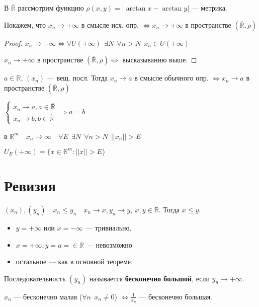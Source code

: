 В $\mathbb{\overline R}$ рассмотрим функцию $\rho(x,y)=|\arctan x - \arctan y|$ --- метрика.

Покажем, что $x_n\to +\infty$ в смысле исх. опр. $\Leftrightarrow x_n\to+\infty$ в пространстве $(\mathbb{\overline R}, \rho)$

\begin{proof}
$x_n\to+\infty \Leftrightarrow \forall U(+\infty) \ \ \exists N \ \ \forall n>N \ \ x_n\in U(+\infty)$

$x_n\to+\infty$ в пространстве $(\mathbb{\overline R}, \rho) \Leftrightarrow $ высказыванию выше.
\end{proof}

\begin{remark}
$a\in\mathbb{R}$, $(x_n)$ --- вещ. посл. Тогда $x_n\to a$ в смысле обычного опр. $\Leftrightarrow x_n\to a$ в пространстве $(\mathbb{\overline R}, \rho)$
\end{remark}

$\begin{cases}
    x_n\to a, a\in\mathbb{\overline R} \\
    x_n\to b, b\in\mathbb{\overline R}
\end{cases} \Rightarrow a=b$

в $\mathbb{R}^m \quad x_n\to\infty \quad \forall E \ \ \exists N \ \ \forall n>N \ \
||x_n||>E$

$U_E(+\infty)=\{x\in\mathbb{R}^m : ||x||>E\}$

\section{Ревизия}

$(x_n), (y_n) \quad x_n\leq y_n \quad x_n\to x, y_n\to y, \ x,y \in\mathbb{\overline R}$. Тогда $x\leq y$.

\begin{itemize}
\item $y=+\infty$ или $x=-\infty$ --- тривиально.
\item $x=+\infty, y=a=\in\mathbb{R}$ --- невозможно
\item остальное --- как в основной теореме.
\end{itemize}

\begin{definition}
Последовательность $(y_n)$ называется \textbf{бесконечно большой}, если $y_n\to +\infty$.
\end{definition}

\begin{remark}
$x_n$ --- бесконечно малая ($\forall n \ \ x_n\not = 0$) $\Leftrightarrow \frac{1}{x_n}$ --- бесконечно большая.
\end{remark}

